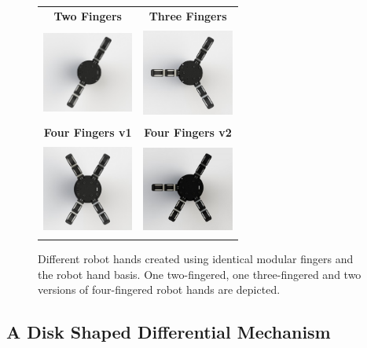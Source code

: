 \begin{figure}[h!]
\begin{center}
\begin{tabular}{  c  c  }
{\bf{Two Fingers}} & {\bf{Three Fingers}} \\ 
\includegraphics[height=3cm,width=3cm]{figures/Intro/Fig1-3-1.jpg}&
\includegraphics[height=3cm,width=3cm]{figures/Intro/Fig1-3-2.jpg} \\ 
{\bf{Four Fingers v1}} & {\bf{Four Fingers v2}}\\ 
\includegraphics[height=3cm,width=3cm]{figures/Intro/Fig1-3-3.jpg}&
\includegraphics[height=3cm,width=3cm]{figures/Intro/Fig1-3-4.jpg}\\ 
\end{tabular}
\end{center}
\caption{Different robot hands created using identical modular fingers and the robot hand basis. One two-fingered, one three-fingered and two versions of four-fingered robot hands are depicted.} 
\label{Modular Base}
\end{figure}

\subsection{A Disk Shaped Differential Mechanism}

